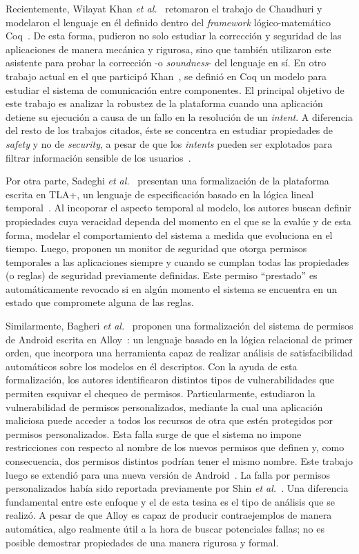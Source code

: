 Recientemente, Wilayat Khan \textit{et al.}~\cite{khan} retomaron el trabajo de Chaudhuri y
modelaron el lenguaje en él definido dentro del \textit{framework} lógico-matemático Coq~\cite{coq}.
De esta forma, pudieron no solo estudiar la corrección y seguridad de las aplicaciones de manera
mecánica y rigurosa, sino que también utilizaron este asistente para probar la corrección -o
\textit{soundness}- del lenguaje en sí. En otro trabajo actual en el que participó
Khan~\cite{crashsafe}, se definió en Coq un modelo para estudiar el sistema de comunicación entre
componentes. El principal objetivo de este trabajo es analizar la robustez de la plataforma cuando
una aplicación detiene su ejecución a causa de un fallo en la resolución de un \textit{intent}. A
diferencia del resto de los trabajos citados, éste se concentra en estudiar propiedades de
\textit{safety} y no de \textit{security}, a pesar de que los \textit{intents} pueden ser explotados
para filtrar información sensible de los usuarios~\cite{iccta}.

Por otra parte, Sadeghi \textit{et al.}~\cite{sadeghi-temp} presentan una formalización de la
plataforma escrita en TLA+, un lenguaje de especificación basado en la lógica lineal
temporal~\cite{tla+}. Al incoporar el aspecto temporal al modelo, los autores buscan definir
propiedades cuya veracidad dependa del momento en el que se la evalúe y de esta forma, modelar el
comportamiento del sistema a medida que evoluciona en el tiempo. Luego, proponen un monitor de
seguridad que otorga permisos temporales a las aplicaciones siempre y cuando se cumplan todas las
propiedades (o reglas) de seguridad previamente definidas. Este permiso ``prestado'' es
automáticamente revocado si en algún momento el sistema se encuentra en un estado que compromete
alguna de las reglas.

Similarmente, Bagheri \textit{et al.}~\cite{bagheri15} proponen una formalización del sistema de
permisos de Android escrita en Alloy~\cite{alloy}: un lenguaje basado en la lógica relacional de
primer orden, que incorpora una herramienta capaz de realizar análisis de satisfacibilidad
automáticos sobre los modelos en él descriptos. Con la ayuda de esta formalización, los autores
identificaron distintos tipos de vulnerabilidades que permiten esquivar el chequeo de permisos.
Particularmente, estudiaron la vulnerabilidad de permisos personalizados, mediante la cual una
aplicación maliciosa puede acceder a todos los recursos de otra que estén protegidos por permisos
personalizados. Esta falla surge de que el sistema no impone restricciones con respecto al nombre de
los nuevos permisos que definen y, como consecuencia, dos permisos distintos podrían tener el mismo
nombre. Este trabajo luego se extendió para una nueva versión de Android~\cite{bagheri}. La falla
por permisos personalizados había sido reportada previamente por Shin \textit{et
    al.}~\cite{shin-custom}. Una diferencia fundamental entre este enfoque y el de esta tesina es el
tipo de análisis que se realizó. A pesar de que Alloy es capaz de producir contraejemplos de manera
automática, algo realmente útil a la hora de buscar potenciales fallas; no es posible demostrar
propiedades de una manera rigurosa y formal.

